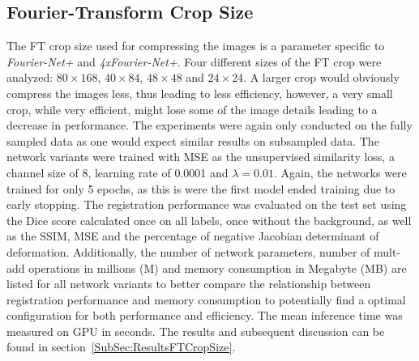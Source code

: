 \documentclass[english,version-2022-01]{uzl-thesis} %
\begin{document}
\subsection{Fourier-Transform Crop Size} \label{SubSec:FTCropSize}
The FT crop size used for compressing the images is a parameter specific to \emph{Fourier-Net+} and \emph{4xFourier-Net+}. Four different sizes of the FT crop were analyzed: $80 \times 168$, $40 \times 84$, $48 \times 48$ and $24 \times 24$. A larger crop would obviously compress the images less, thus leading to less efficiency, however, a very small crop, while very efficient, might lose some of the image details leading to a decrease in performance. The experiments were again only conducted on the fully sampled data as one would expect similar results on subsampled data. The network variants were trained with MSE as the unsupervised similarity loss, a channel size of 8, learning rate of 0.0001 and $\lambda=0.01$. Again, the networks were trained for only 5 epochs, as this is were the first model ended training due to early stopping. The registration performance was evaluated on the test set using the Dice score calculated once on all labels, once without the background, as well as the SSIM, MSE and the percentage of negative Jacobian determinant of deformation. Additionally, the number of network parameters, number of mult-add operations in millions (M) and memory consumption in Megabyte (MB) are listed for all network variants to better compare the relationship between registration performance and memory consumption to potentially find a optimal configuration for both performance and efficiency. The mean inference time was measured on GPU in seconds. The results and subsequent discussion can be found in section~\ref{SubSec:ResultsFTCropSize}.
\end{document}
